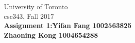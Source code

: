 \documentclass{article}
\newcommand{\var}[1]{\mathit{#1}}
\begin{document}
\noindent
University of Toronto\\
{\sc csc}343, Fall 2017\\[10pt]
{\LARGE\bf Assignment 1:\hspace*{1cm}Yifan Fang \hspace*{2cm} 1002563825\\[5pt]
\hspace*{5cm}        Zhaoning Kong \hspace*{0.7cm} 1004654288
} \\[10pt]

%
%
\end{document}

